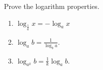 \begin{frame}
\begin{example}
Prove the logarithm properties.
\begin{enumerate}
\item  $\log_{\frac{1}{a}}x=-\log_a x$
\item  $\log_{a}b=\frac{1}{\log_b a}$.
\item  $\log_{a^k}b=\frac{1}{k}\log_a b$.
\end{enumerate}

\end{example}
\end{frame}